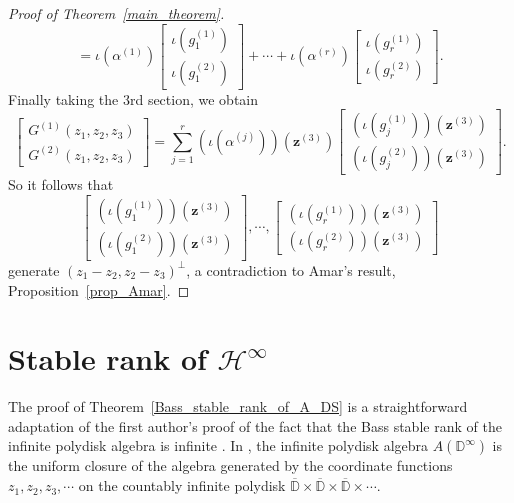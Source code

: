 \documentclass[11pt,reqno]{amsart}
\numberwithin{equation}{section}
\theoremstyle{definition}
\theoremstyle{definition}
\theoremstyle{definition}
\begin{document}
\begin{proof}[Proof of Theorem~\ref{main_theorem}]
$$=
\iota(\alpha^{(1)}) 
\left[ \begin{array}{cc} \iota(g_1^{(1)}) \\ \iota(g_1^{(2)})\end{array}\right]
+ \cdots +
\iota(\alpha^{(r)}) 
\left[ \begin{array}{cc} \iota(g_r^{(1)}) \\ \iota(g_r^{(2)}) \end{array}\right].
$$
Finally taking the $3$rd section, we obtain
$$
\left[\begin{array}{cc} G^{(1)}(z_1,z_2,z_3) \\ G^{(2)}(z_1,z_2,z_3)\end{array}\right] 
=
\sum_{j=1}^r (\iota(\alpha^{(j)}))(\mathbf{z}^{(3)}) 
\left[ \begin{array}{cc} (\iota(g_j^{(1)}))(\mathbf{z}^{(3)}) \\ 
(\iota(g_j^{(2)}))(\mathbf{z}^{(3)})\end{array}\right].
$$
So it follows that
$$
\left[ \begin{array}{cc} (\iota(g_1^{(1)}))(\mathbf{z}^{(3)}) \\ 
(\iota(g_1^{(2)}))(\mathbf{z}^{(3)})\end{array}\right],
\cdots ,
\left[ \begin{array}{cc} (\iota(g_r^{(1)}))(\mathbf{z}^{(3)}) \\ 
(\iota(g_r^{(2)}))(\mathbf{z}^{(3)}) \end{array}\right]
$$
generate $(z_1-z_2,z_2-z_3)^\perp$, a contradiction to Amar's result,
Proposition~\ref{prop_Amar}.
\end{proof}

\section{Stable rank of ${{{\mathscr{H}}^{\infty}}}$}

The proof of Theorem~\ref{Bass_stable_rank_of_A_DS} is a
straightforward adaptation of the first author's proof of the fact that
the Bass stable rank of the infinite polydisk algebra is infinite
\cite[Proposition~1]{Mor}.  In \cite{Mor}, the infinite polydisk algebra
$A({\mathbb{D}}^\infty)$ is the uniform closure of the algebra generated by the
coordinate functions $z_1,z_2,z_3,\cdots$ on the countably infinite
polydisk $\overline{\mathbb{D}}\times \overline{\mathbb{D}}\times
\overline{\mathbb{D}}\times \cdots$.
\end{document}
